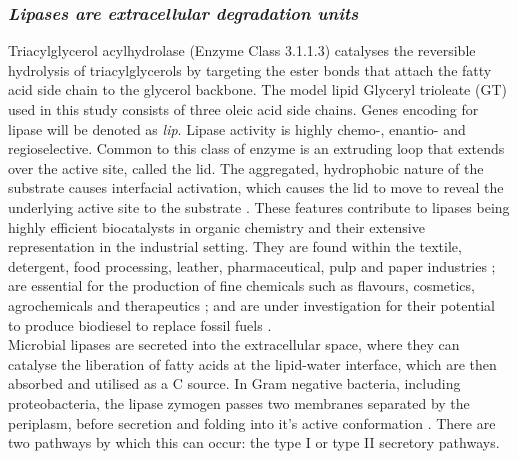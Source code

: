 \documentclass[11pt]{article}
\begin{document}

\subsubsection{\emph{Lipases are extracellular degradation units}}
Triacylglycerol acylhydrolase (Enzyme Class 3.1.1.3) catalyses the reversible hydrolysis of triacylglycerols by targeting the ester bonds that attach the fatty acid side chain to the glycerol backbone. The model lipid Glyceryl trioleate (GT) used in this study consists of three oleic acid side chains. Genes encoding for lipase will be denoted as \emph{lip}.
Lipase activity is highly chemo-, enantio- and regioselective. Common to this class of enzyme is an extruding loop that extends over the active site, called the lid. The aggregated, hydrophobic nature of the substrate causes interfacial activation, which causes the lid to move to reveal the underlying active site to the substrate \cite{derewenda1992,van_Tilbeurgh1993}. These features contribute to lipases being highly efficient biocatalysts in organic chemistry and their extensive representation in the industrial setting. 
They are found within the textile, detergent, food processing, leather, pharmaceutical, pulp and paper industries \cite{hasan_06}; are essential for the production of fine chemicals such as flavours, cosmetics, agrochemicals and therapeutics \cite{jaeger2002}; and are under investigation for their potential to produce biodiesel to replace fossil fuels \cite{hasan_06,iso2001}. \\


Microbial lipases are secreted into the extracellular space, where they can catalyse the liberation of fatty acids at the lipid-water interface, which are then absorbed and utilised as a C source. In Gram negative bacteria, including proteobacteria, the lipase zymogen passes two membranes separated by the periplasm, before secretion and folding into it's active conformation \cite{bos2007,michel2009}. There are two pathways by which this can occur: the type I or type II secretory pathways. \\
\end{document}
